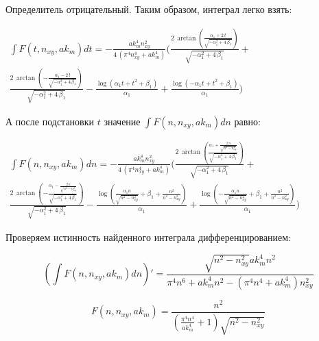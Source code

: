 \documentclass[11pt]{article}
\begin{document}
    Определитель отрицательный. Таким образом, интеграл легко взять:

    \(\begin{array}{r} \int F\left(t, n_{xy}, ak_m\right) dt = -\frac{\mathit{ak}_{m}^{4} n_{\mathit{xy}}^{2}}{4 \, {\left(\pi^{4} n_{\mathit{xy}}^{4} + \mathit{ak}_{m}^{4}\right)}} \Bigg(\frac{2 \, \arctan\left(\frac{\alpha_{1} + 2 \, t}{\sqrt{-\alpha_{1}^{2} + 4 \, \beta_{1}}}\right)}{\sqrt{-\alpha_{1}^{2} + 4 \, \beta_{1}}} + \\ \frac{2 \, \arctan\left(-\frac{\alpha_{1} - 2 \, t}{\sqrt{-\alpha_{1}^{2} + 4 \, \beta_{1}}}\right)}{\sqrt{-\alpha_{1}^{2} + 4 \, \beta_{1}}} - \frac{\log\left(\alpha_{1} t + t^{2} + \beta_{1}\right)}{\alpha_{1}} + \frac{\log\left(-\alpha_{1} t + t^{2} + \beta_{1}\right)}{\alpha_{1}}\Bigg) \end{array}\)

    А после подстановки \(t\) значение
\(\int F\left(n, n_{xy}, ak_m\right) dn\) равно:

    \(\begin{array}{r} \int F\left(n, n_{xy}, ak_m\right) dn = -\frac{\mathit{ak}_{m}^{4} n_{\mathit{xy}}^{2}}{4 \, {\left(\pi^{4} n_{\mathit{xy}}^{4} + \mathit{ak}_{m}^{4}\right)}} \Bigg(\frac{2 \, \arctan\left(\frac{\alpha_{1} + \frac{2 \, n}{\sqrt{n^{2} - n_{\mathit{xy}}^{2}}}}{\sqrt{-\alpha_{1}^{2} + 4 \, \beta_{1}}}\right)}{\sqrt{-\alpha_{1}^{2} + 4 \, \beta_{1}}} + \\ \frac{2 \, \arctan\left(-\frac{\alpha_{1} - \frac{2 \, n}{\sqrt{n^{2} - n_{\mathit{xy}}^{2}}}}{\sqrt{-\alpha_{1}^{2} + 4 \, \beta_{1}}}\right)}{\sqrt{-\alpha_{1}^{2} + 4 \, \beta_{1}}} - \frac{\log\left(\frac{\alpha_{1} n}{\sqrt{n^{2} - n_{\mathit{xy}}^{2}}} + \beta_{1} + \frac{n^{2}}{n^{2} - n_{\mathit{xy}}^{2}}\right)}{\alpha_{1}} + \frac{\log\left(-\frac{\alpha_{1} n}{\sqrt{n^{2} - n_{\mathit{xy}}^{2}}} + \beta_{1} + \frac{n^{2}}{n^{2} - n_{\mathit{xy}}^{2}}\right)}{\alpha_{1}}\Bigg) \end{array}\)

    Проверяем истинность найденного интеграла дифференцированием:

    \[\left( \int F\left(n, n_{xy}, ak_m\right) dn \right)' = \frac{\sqrt{n^{2} - n_{\mathit{xy}}^{2}} \mathit{ak}_{m}^{4} n^{2}}{\pi^{4} n^{6} + \mathit{ak}_{m}^{4} n^{2} - {\left(\pi^{4} n^{4} + \mathit{ak}_{m}^{4}\right)} n_{\mathit{xy}}^{2}}\]

\[F\left(n, n_{xy}, ak_m\right)= \frac{n^{2}}{{\left(\frac{\pi^{4} n^{4}}{\mathit{ak}_{m}^{4}} + 1\right)} \sqrt{n^{2} - n_{\mathit{xy}}^{2}}}\]
\end{document}
